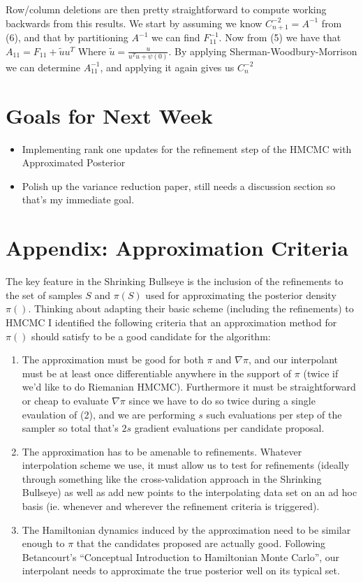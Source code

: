 \documentclass[12pt,a4paper]{article}
\begin{document}
Row/column deletions are then pretty straightforward to compute working backwards from this results.  We start by assuming we know $C_{n+1}^{-2} = A^{-1}$ from (6), and that by partitioning $A^{-1}$ we can find $F_{11}^{-1}$.  Now from (5) we have that $A_{11} = F_{11} + \tilde{u} u^T$ Where $\tilde{u} = \frac{u}{u^Tu + \psi(0)}$.  By applying Sherman-Woodbury-Morrison we can determine $A_{11}^{-1}$, and applying it again gives us $C_n^{-2}$

\section{Goals for Next Week}
\begin{itemize}
\item Implementing rank one updates for the refinement step of the HMCMC with Approximated Posterior
\item Polish up the variance reduction paper, still needs a discussion section so that's my immediate goal.
\end{itemize}

\section{Appendix: Approximation Criteria}
The key feature in the Shrinking Bullseye is the inclusion of the refinements to the set of samples $S$ and $\pi(S)$ used for approximating the posterior density $\pi()$.  Thinking about adapting their basic scheme (including the refinements) to HMCMC I identified the following criteria that an approximation method for $\pi()$ should satisfy to be a good candidate for the algorithm:
\begin{enumerate}
\item The approximation must be good for both $\pi$ and $\nabla \pi$, and our interpolant must be at least once differentiable anywhere in the support of $\pi$ (twice if we’d like to do Riemanian HMCMC). Furthermore it must be straightforward or cheap to evaluate $\nabla \pi$ since we have to do so twice during a single evaulation of (2), and we are performing $s$ such evaluations per step of the sampler so total that’s $2s$ gradient evaluations per candidate proposal.
\item The approximation has to be amenable to refinements. Whatever interpolation scheme  we use, it must allow us to test for refinements (ideally through something like the cross-validation approach in the Shrinking Bullseye) as well as add new points to the interpolating data set on an ad hoc basis (ie. whenever and wherever the refinement criteria is triggered).
\item  The Hamiltonian dynamics induced by the approximation  need to be similar enough to $\pi$ that the candidates proposed are actually good. Following Betancourt’s “Conceptual Introduction to Hamiltonian Monte Carlo”, our interpolant needs to approximate the true posterior well on its typical set.
\end{enumerate}
\end{document}
